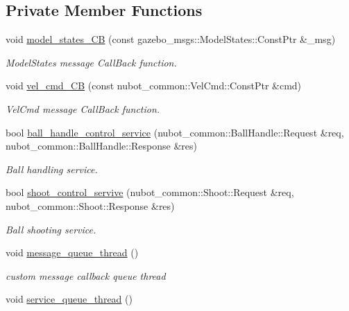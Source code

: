 \subsection*{Private Member Functions}
\begin{DoxyCompactItemize}
\item 
void \hyperlink{classgazebo_1_1NubotGazebo_a96b102bf11d96dda2cdab0f2f9460d8d}{model\-\_\-states\-\_\-\-C\-B} (const gazebo\-\_\-msgs\-::\-Model\-States\-::\-Const\-Ptr \&\-\_\-msg)
\begin{DoxyCompactList}\small\item\em Model\-States message Call\-Back function. \end{DoxyCompactList}\item 
void \hyperlink{classgazebo_1_1NubotGazebo_aafe5e8deca0e5a85a30c73629eee8703}{vel\-\_\-cmd\-\_\-\-C\-B} (const nubot\-\_\-common\-::\-Vel\-Cmd\-::\-Const\-Ptr \&cmd)
\begin{DoxyCompactList}\small\item\em Vel\-Cmd message Call\-Back function. \end{DoxyCompactList}\item 
bool \hyperlink{classgazebo_1_1NubotGazebo_ae042db5614aea3da7c8f547c44d9ff6e}{ball\-\_\-handle\-\_\-control\-\_\-service} (nubot\-\_\-common\-::\-Ball\-Handle\-::\-Request \&req, nubot\-\_\-common\-::\-Ball\-Handle\-::\-Response \&res)
\begin{DoxyCompactList}\small\item\em Ball handling service. \end{DoxyCompactList}\item 
bool \hyperlink{classgazebo_1_1NubotGazebo_ade096537ecc11263f1dd14428325329b}{shoot\-\_\-control\-\_\-servive} (nubot\-\_\-common\-::\-Shoot\-::\-Request \&req, nubot\-\_\-common\-::\-Shoot\-::\-Response \&res)
\begin{DoxyCompactList}\small\item\em Ball shooting service. \end{DoxyCompactList}\item 
void \hyperlink{classgazebo_1_1NubotGazebo_a2c87fbf2e13762d4827367028d493670}{message\-\_\-queue\-\_\-thread} ()
\begin{DoxyCompactList}\small\item\em custom message callback queue thread \end{DoxyCompactList}\item 
void \hyperlink{classgazebo_1_1NubotGazebo_abe786a1fbc3407f1b2ac655b1af15a8b}{service\-\_\-queue\-\_\-thread} ()

\end{DoxyCompactItemize}
